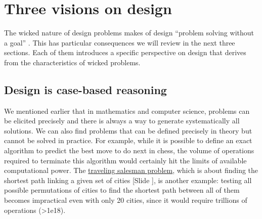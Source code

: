 \documentclass{article}
\newcounter{slide}
\begin{document}
\section{Three visions on design}
\label{sec:threevisions}
The wicked nature of design problems makes of design ``problem solving without a goal'' \cite[p. 106]{simon1996sciences}. This has particular consequences we will review in the next three sections. Each of them introduces a specific perspective on design that derives from the characteristics of wicked problems. 

\subsection{Design is case-based reasoning}
\label{sec:heuristics}
We mentioned earlier that in mathematics and computer science, problems can be elicited precisely and there is always a way to generate systematically all solutions. We can also find problems that can be defined precisely in theory but cannot be solved in practice. For example, while it is possible to define an exact algorithm to predict the best move to do next in chess, the volume of operations required to terminate this algorithm would certainly hit the limits of available computational power. The \href{https://en.wikipedia.org/wiki/Travelling_salesman_problem}{traveling salesman problem}, which is about finding the shortest path linking a given set of cities {\color{blue}[Slide ]}, is another example: testing all possible permutations of cities to find the shortest path between all of them becomes impractical even with only 20 cities, since it would require trillions of operations (\textgreater 1e18). 
\end{document}
